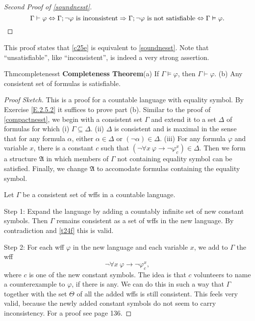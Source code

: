 \begin{proof}[Second Proof of \ref{soundnesst}]
  \[
    \Gamma\vdash \varphi\Leftrightarrow \Gamma;\neg \varphi\text{ is inconsistent}\Rightarrow \Gamma;\neg \varphi\text{ is not satisfiable}\Leftrightarrow \Gamma\vDash \varphi.\qedhere
  \]
\end{proof}
This proof states that \ref{c25e} is equivalent to \ref{soundnesst}. Note that ``unsatisfiable'', like ``inconsistent'', is indeed a very strong assertion.

\begin{reference}{Thm}{completenesst}
  \textbf{Completeness Theorem}\quad(a) If $\Gamma\vDash \varphi$, then $\Gamma\vdash \varphi$. (b) Any consistent set of formulas is satisfiable.\qedhere
\end{reference}

\begin{proof}[Proof Sketch]
  This is a proof for a countable language with equality symbol. By Exercise \ref{E.2.5.2} it suffices to prove part (b). Similar to the proof of \ref{compactnesst}, we begin with a consistent set $\Gamma$ and extend it to a set $\Delta$ of formulas for which (i) $\Gamma\subseteq \Delta$. (ii) $\Delta$ is consistent and is maximal in the sense that for any formula $\alpha$, either $\alpha\in \Delta$ or $(\neg \alpha)\in \Delta$. (iii) For any formula $\varphi$ and variable $x$, there is a constant $c$ such that $(\neg\forall x\ \varphi\rightarrow\neg \varphi_c^x)\in \Delta.$ Then we form a structure $\mathfrak{A}$ in which members of $\Gamma$ not containing equality symbol can be satisfied. Finally, we change $\mathfrak{A}$ to accomodate formulas containing the equality symbol.

  Let $\Gamma$ be a consistent set of wffs in a countable language.

  Step 1: Expand the language by adding a countably infinite set of new constant symbols. Then $\Gamma$ remains consistent as a set of wffs in the new language. By contradiction and \ref{t24f} this is valid.

  Step 2: For each wff $\varphi$ in the new language and each variable $x$, we add to $\Gamma$ the wff
  \[
    \neg\forall x\ \varphi\rightarrow\neg \varphi_c^x,
  \]
  where $c$ is one of the new constant symbols. The idea is that $c$ volunteers to name a counterexample to $\varphi$, if there is any. We can do this in such a way that $\Gamma$ together with the set $\Theta$ of all the added wffs is still consistent. This feels very valid, because the newly added constant symbols do not seem to carry inconsistency. For a proof see page 136.


\end{proof}
